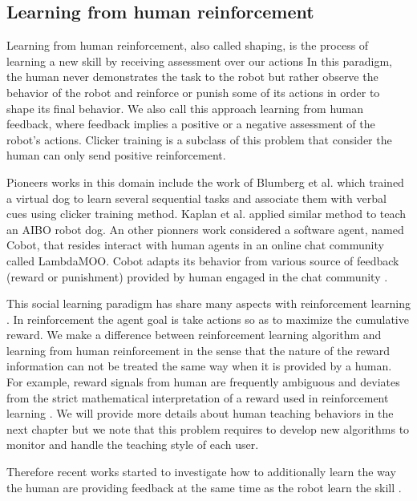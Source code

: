 \subsection{Learning from human reinforcement}

Learning from human reinforcement, also called shaping, is the process of learning a new skill by receiving assessment over our actions In this paradigm, the human never demonstrates the task to the robot but rather observe the behavior of the robot and reinforce or punish some of its actions in order to shape its final behavior. We also call this approach learning from human feedback, where feedback implies a positive or a negative assessment of the robot's actions. Clicker training is a subclass of this problem that consider the human can only send positive reinforcement.

Pioneers works in this domain include the work of Blumberg et al. \cite{blumberg2002integrated} which trained a virtual dog to learn several sequential tasks and associate them with
verbal cues using clicker training method. Kaplan et al. \cite{kaplan2002robotic} applied similar method to teach an AIBO robot dog. An other pionners work considered a software agent, named Cobot, that resides interact with human agents in an online chat community called LambdaMOO. Cobot adapts its behavior from various source of feedback (reward or punishment) provided by human engaged in the chat community \cite{isbell2001social}.

This social learning paradigm has share many aspects with reinforcement learning \cite{sutton1998reinforcement}. In reinforcement the agent goal is take actions so as to maximize the cumulative reward. We make a difference between reinforcement learning algorithm and learning from human reinforcement in the sense that the nature of the reward information can not be treated the same way when it is provided by a human. For example, reward signals from human are frequently ambiguous and deviates from the strict mathematical interpretation of a reward used in reinforcement learning \cite{thomaz2008teachable,Cakmak2010optimality}. We will provide more details about human teaching behaviors in the next chapter but we note that this problem requires to develop new algorithms to monitor and handle the teaching style of each user.

Therefore recent works started to investigate how to additionally learn the way the human are providing feedback at the same time as the robot learn the skill \cite{knox2009interactively}. 

